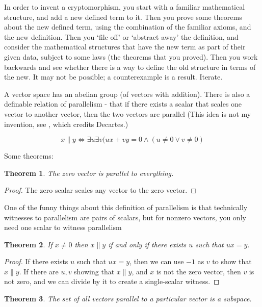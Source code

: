 \documentclass[11pt, noamsfonts]{amsart}
\newtheorem{theorem}{Theorem}
\begin{document}
In order to invent a cryptomorphism, you start with a familiar
mathematical structure, and add a new defined term to it.
Then you prove some theorems about the new defined term, using
the combination of the familiar axioms, and the new definition.
Then you `file off' or `abstract away' the definition, and consider
the mathematical structures that have the new term as part of their given data, subject to some laws (the theorems that you proved).
Then you work backwards and see whether there is a way to define
the old structure in terms of the new. It may not be possible; a counterexample is a result. Iterate.

A vector space has an abelian group (of vectors with addition).
There is also a definable relation of parallelism - that if there exists a scalar that scales one vector to another vector,
then the two vectors are parallel (This idea is not my invention,
see \cite{pierce2009model}, which credits Decartes.)

\[
x \parallel y \Leftrightarrow \exists u \exists v (u x + v y = 0 \wedge (u \neq 0 \vee v \neq 0)
\]

Some theorems:

\begin{theorem}
The zero vector is parallel to everything.
\end{theorem}

\begin{proof}
The zero scalar scales any vector to the zero vector.
\end{proof}

One of the funny things about this definition of parallelism is
that technically witnesses to parallelism are pairs of scalars,
but for nonzero vectors, you only need one scalar to witness parallelism

\begin{theorem}
If \(x \neq 0\) then \(x \parallel y\) if and only if there exists \(u\) such that \(u x = y\).
\end{theorem}

\begin{proof}
If there exists \(u\) such that \(u x = y\), then we can use \(-1\) as \(v\) to show that \(x \parallel y\). 
If there are \(u, v\) showing that \(x \parallel y\), and \(x\) is not the zero vector, then \(v\) is not zero, and we can divide by it to create a single-scalar witness. 
\end{proof}

\begin{theorem}
The set of all vectors parallel to a particular vector is a subspace.
\end{theorem}
\end{document}
